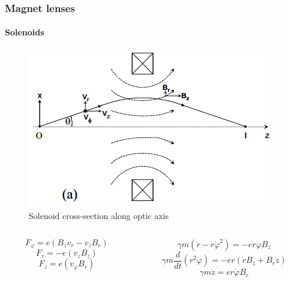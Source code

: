 \documentclass{beamer}
\begin{document}
\begin{frame}
  \frametitle{Magnet lenses}
  \framesubtitle{Solenoids}
\begin{figure}
  \includegraphics[width=.5\textwidth]{El_traj_in_B1.png}
  \caption{Solenoid cross-section along optic axis}
\end{figure}
  \begin{scriptsize}
\begin{columns}
  \begin{column}{0.45\textwidth}
  \begin{equation}
   F_{\varphi}=e\left(B_{z}v_{r} - v_{z}B_{r}\right)
  \end{equation}
  \begin{equation}
  F_{r}=-e\left(v_{z}B_{z}\right)
  \end{equation}
  \begin{equation}
  F_{z}=e\left(v_{\varphi}B_{r}\right)
  \end{equation}
  \end{column}
  \begin{column}{0.55\textwidth}
  \begin{equation}
  \gamma m\left(\ddot{r}-r\dot{\varphi}^{2}\right)=-er\dot{\varphi}B_{z}
  \end{equation}
  \begin{equation}
  \gamma m\frac{d}{dt}\left(r^{2}\dot{\varphi}\right)=-er(\dot rB_{z}+B_{r}\dot{z})
  \end{equation}
  \begin{equation}
  \gamma m\ddot{z}=er\dot{\varphi}B_{r}
  \end{equation}
  \end{column}
 \end{columns}
  \end{scriptsize}
  \end{frame}
\end{document}
